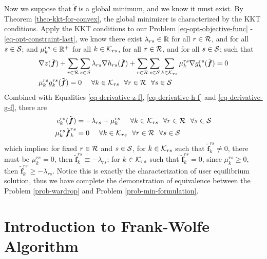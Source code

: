 \documentclass{article}
\begin{document}
Now we suppose that $ \tilde{\boldsymbol{f}} $ is a global minimum, and we know it must exist. By Theorem \ref{theo-kkt-for-convex}, the global minimizer is characterized by the KKT conditions. Apply the KKT conditions to our Problem \ref{eq-opt-objective-func} - \ref{eq-opt-constraint-last}, we know there exist $ \lambda_{rs} \in \mathbb{R} $ for all $ r \in \mathcal{R} $, and for all $ s \in \mathcal{S} $; and $ \mu^{rs}_k \in \mathbb{R}^+ $ for all $ k \in \mathcal{K}_{rs} $, for all $ r \in \mathcal{R} $, and for all $ s \in \mathcal{S} $; such that 
\begin{align}
    &\nabla z (\tilde{\boldsymbol{f}}) + \sum_{r \in \mathcal{R}} \sum_{s \in \mathcal{S}} \lambda_{rs} \nabla h_{rs} (\tilde{\boldsymbol{f}}) + \sum_{r \in \mathcal{R}} \sum_{s \in \mathcal{S}} \sum_{k \in \mathcal{K}_{rs}} \mu_k^{rs} \nabla g_k^{rs} (\tilde{\boldsymbol{f}}) = 0 \\ 
    &\mu_k^{rs} g_k^{rs} (\tilde{\boldsymbol{f}}) = 0 ~~~~ \forall k \in \mathcal{K}_{rs} ~~ \forall r \in \mathcal{R} ~~ \forall s \in \mathcal{S}
\end{align}
Combined with Equalities \ref{eq-derivative-z-f}, \ref{eq-derivative-h-f} and \ref{eq-derivative-g-f}, there are
\begin{align}
    c_k^{rs} (\tilde{\boldsymbol{f}}) &= - \lambda_{rs} + \mu_k^{rs} ~~~~ \forall k \in \mathcal{K}_{rs} ~~ \forall r \in \mathcal{R} ~~ \forall s \in \mathcal{S} \\ 
    \mu_k^{rs} \tilde{\boldsymbol{f}}^{rs}_k &= 0 ~~~~ \forall k \in \mathcal{K}_{rs} ~~ \forall r \in \mathcal{R} ~~ \forall s \in \mathcal{S}
\end{align}
which implies: for fixed $ r \in \mathcal{R} $ and $ s \in \mathcal{S} $, for $ k \in \mathcal{K}_{rs} $ such that $ \tilde{\boldsymbol{f}}^{rs}_k \neq 0 $, there must be $ \mu_k^{rs} = 0 $, then $ \tilde{\boldsymbol{f}}^{rs}_k \equiv - \lambda_{rs} $; for $ k \in \mathcal{K}_{rs} $ such that $ \tilde{\boldsymbol{f}}^{rs}_k = 0 $, since $ \mu_k^{rs} \ge 0 $, then $ \tilde{\boldsymbol{f}}^{rs}_k \ge - \lambda_{rs} $. Notice this is exactly the characterization of user equilibrium solution, thus we have complete the demonstration of equivalence between the Problem \ref{prob-wardrop} and Problem \ref{prob-min-formulation}.

\section{Introduction to Frank-Wolfe Algorithm}

\printbibliography
\end{document}
